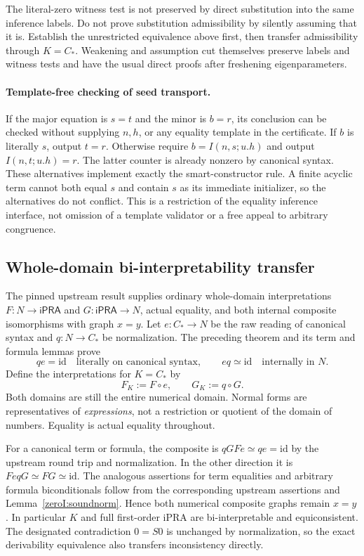 \documentclass[11pt,a4paper]{article}
\theoremstyle{definition}
\begin{document}
The literal-zero witness test is not preserved by direct substitution
into the same inference labels.  Do not prove substitution admissibility
by silently assuming that it is.  Establish the unrestricted equivalence
above first, then transfer admissibility through $K=C_*$.  Weakening and
assumption cut themselves preserve labels and witness tests and have the
usual direct proofs after freshening eigenparameters.

\paragraph{Template-free checking of seed transport.}
If the major equation is $s=t$ and the minor is $b=r$, its conclusion can
be checked without supplying $n,h$, or any equality template in the
certificate.  If $b$ is literally $s$, output $t=r$.  Otherwise require
$b=I(n,s;u.h)$ and output $I(n,t;u.h)=r$.  The latter counter is already
nonzero by canonical syntax.  These alternatives implement exactly the
smart-constructor rule.  A finite acyclic term cannot both equal $s$ and
contain $s$ as its immediate initializer, so the alternatives do not
conflict.  This is a restriction of the equality inference interface,
not omission of a template validator or a free appeal to arbitrary
congruence.

\subsection{Whole-domain bi-interpretability transfer}

The pinned upstream result supplies ordinary whole-domain interpretations
$F:N\to\mathsf{iPRA}$ and $G:\mathsf{iPRA}\to N$, actual equality,
and both internal composite isomorphisms with graph $x=y$.  Let
$e:C_*\to N$ be the raw reading of canonical syntax and
$q:N\to C_*$ be normalization.  The preceding theorem and its term
and formula lemmas prove
\[
 qe=\mathrm{id}\quad\text{literally on canonical syntax},
 \qquad eq\simeq\mathrm{id}\quad\text{internally in }N.
\]
Define the interpretations for $K=C_*$ by
\[
 F_K:=F\circ e,\qquad G_K:=q\circ G.
\]
Both domains are still the entire numerical domain.  Normal forms are
representatives of \emph{expressions}, not a restriction or quotient of
the domain of numbers.  Equality is actual equality throughout.

For a canonical term or formula, the composite is
$qGFe\simeq qe=\mathrm{id}$ by the upstream round trip and
normalization.  In the other direction it is
$FeqG\simeq FG\simeq\mathrm{id}$.  The analogous assertions for term
equalities and arbitrary formula biconditionals follow from the
corresponding upstream assertions and
Lemma~\ref{zeroI:soundnorm}.  Hence both numerical composite graphs
remain $x=y$.  In particular $K$ and full first-order iPRA are
bi-interpretable and equiconsistent.  The designated contradiction
$0=S0$ is unchanged by normalization, so the exact derivability
equivalence also transfers inconsistency directly.
\end{document}
